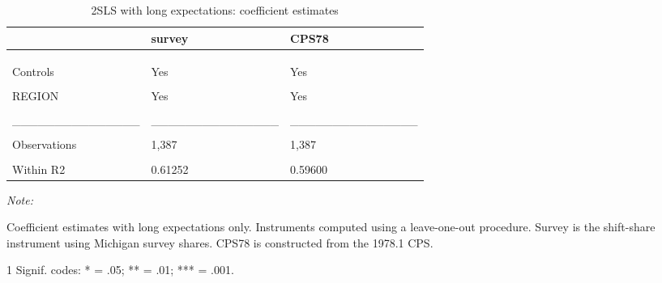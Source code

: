 \begin{table}

\caption{\label{tab:base:5only:2sls:stage2}2SLS with long expectations: coefficient estimates}
\centering
\begin{threeparttable}
\begin{tabular}[t]{lll}
\toprule
  & survey & CPS78\\
\midrule
\cellcolor{gray!6}{Dependent Var.:} & \cellcolor{gray!6}{RegInf} & \cellcolor{gray!6}{RegInf}\\
\addlinespace
 &  & \\
\addlinespace
\cellcolor{gray!6}{long-run pe} & \cellcolor{gray!6}{0.0068 (0.0087)} & \cellcolor{gray!6}{0.0341 (0.0247)}\\
\addlinespace
Controls & Yes & Yes\\
\addlinespace
\cellcolor{gray!6}{Fixed-Effects:} & \cellcolor{gray!6}{---------------} & \cellcolor{gray!6}{---------------}\\
\addlinespace
REGION & Yes & Yes\\
\addlinespace
\cellcolor{gray!6}{TIME} & \cellcolor{gray!6}{Yes} & \cellcolor{gray!6}{Yes}\\
\addlinespace
\_\_\_\_\_\_\_\_\_\_\_\_\_\_\_ & \_\_\_\_\_\_\_\_\_\_\_\_\_\_\_ & \_\_\_\_\_\_\_\_\_\_\_\_\_\_\_\\
\addlinespace
\cellcolor{gray!6}{S.E. type} & \cellcolor{gray!6}{Dri.-Kra. (L=4)} & \cellcolor{gray!6}{Dri.-Kra. (L=4)}\\
\addlinespace
Observations & 1,387 & 1,387\\
\addlinespace
\cellcolor{gray!6}{R2} & \cellcolor{gray!6}{0.96000} & \cellcolor{gray!6}{0.95829}\\
\addlinespace
Within R2 & 0.61252 & 0.59600\\
\bottomrule
\end{tabular}
\begin{tablenotes}
\item \textit{Note: } 
\item Coefficient estimates with long expectations only. Instruments computed using a leave-one-out procedure. Survey is the shift-share instrument using Michigan survey shares. CPS78 is constructed from the 1978.1 CPS.
\item[1] Signif. codes: * = .05; ** = .01; *** = .001.
\end{tablenotes}
\end{threeparttable}
\end{table}
